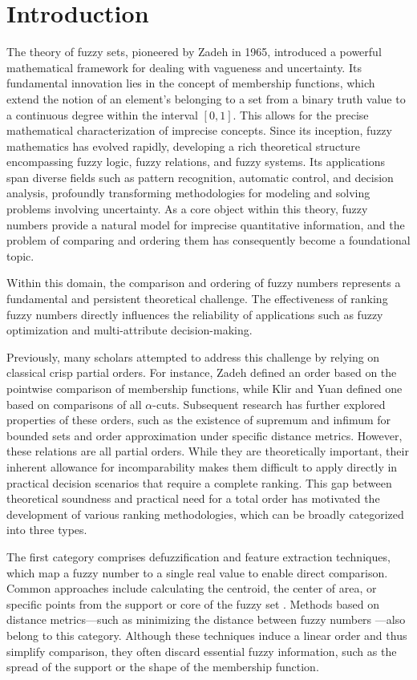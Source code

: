 \documentclass[preprint,3p,times]{elsarticle}
\theoremstyle{plain}
\theoremstyle{definition}
\numberwithin{equation}{section}
\begin{document}
\section{Introduction}
The theory of fuzzy sets, pioneered by Zadeh \cite{ZADEH1965338} in 1965, introduced a powerful mathematical framework for dealing with vagueness and uncertainty. Its fundamental innovation lies in the concept of membership functions, which extend the notion of an element's belonging to a set from a binary truth value to a continuous degree within the interval \([0,1]\). This allows for the precise mathematical characterization of imprecise concepts. Since its inception, fuzzy mathematics has evolved rapidly, developing a rich theoretical structure encompassing fuzzy logic, fuzzy relations, and fuzzy systems. Its applications span diverse fields such as pattern recognition, automatic control, and decision analysis, profoundly transforming methodologies for modeling and solving problems involving uncertainty. As a core object within this theory, fuzzy numbers provide a natural model for imprecise quantitative information, and the problem of comparing and ordering them has consequently become a foundational topic.

Within this domain, the comparison and ordering of fuzzy numbers represents a fundamental and persistent theoretical challenge. The effectiveness of ranking fuzzy numbers directly influences the reliability of applications such as fuzzy optimization and multi-attribute decision-making.

Previously, many scholars attempted to address this challenge by relying on classical crisp partial orders. For instance, Zadeh \cite{ZADEH1971177} defined an order based on the pointwise comparison of membership functions, while Klir and Yuan \cite{Klir1995FuzzySA} defined one based on comparisons of all $\alpha$-cuts. Subsequent research has further explored properties of these orders, such as the existence of supremum and infimum for bounded sets and order approximation under specific distance metrics. However, these relations are all partial orders. While they are theoretically important, their inherent allowance for incomparability makes them difficult to apply directly in practical decision scenarios that require a complete ranking. This gap between theoretical soundness and practical need for a total order has motivated the development of various ranking methodologies, which can be broadly categorized into three types.

The first category comprises defuzzification and feature extraction techniques, which map a fuzzy number to a single real value to enable direct comparison. Common approaches include calculating the centroid, the center of area, or specific points from the support or core of the fuzzy set \cite{BORTOLAN19851,KaufmannGupta1985,CHU2002111}. Methods based on distance metrics---such as minimizing the distance between fuzzy numbers \cite{CHENG1998307}---also belong to this category. Although these techniques induce a linear order and thus simplify comparison, they often discard essential fuzzy information, such as the spread of the support or the shape of the membership function.
\end{document}
